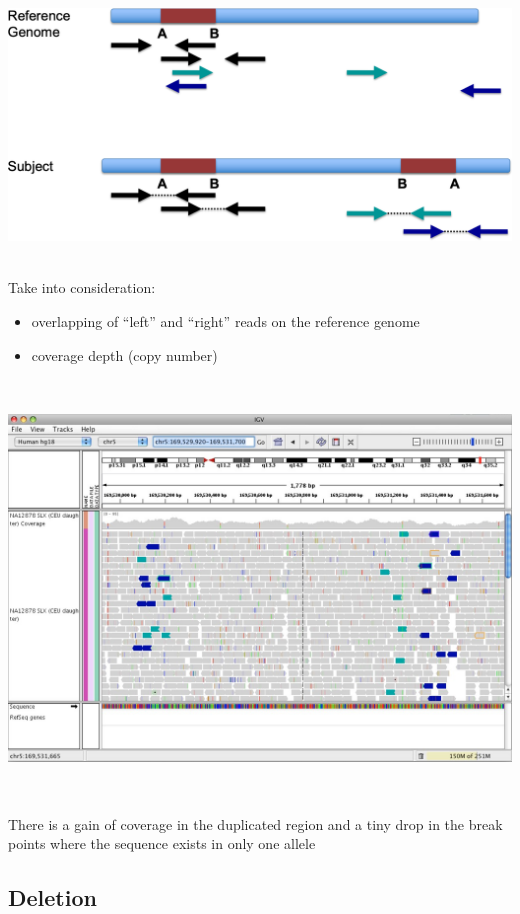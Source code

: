 \includegraphics[width=6.11483in,height=2.82187in]{image25.png}

Take into consideration:


\begin{itemize}
\item
  overlapping of ``left'' and ``right'' reads on the reference genome
\item
  coverage depth (copy number)
\end{itemize}

\includegraphics[width=6.29059in,height=4.34375in]{image26.jpeg}


There is a gain of coverage in the duplicated region and a tiny drop in the
break points where the sequence exists in only one allele


\hypertarget{deletion}{%
\subsection{Deletion}\label{deletion}}


